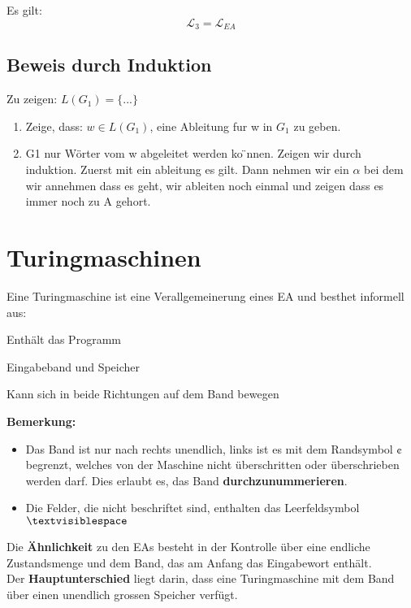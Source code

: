 \documentclass[11pt]{article}
\begin{document}
Es gilt:
\begin{equation*}
	\mathcal{L}_3 = \mathcal{L}_{EA}
\end{equation*}

\subsection{Beweis durch Induktion}

Zu zeigen: $L(G_1) = \{...\}$
\begin{enumerate}
	\item Zeige, dass: $w \in L(G_1)$, eine Ableitung fur w in $G_1$ zu geben.
	\item G1 nur W{\"o}rter vom w abgeleitet werden ko ̈nnen. Zeigen wir durch induktion. Zuerst mit ein ableitung es gilt. Dann nehmen wir ein $\alpha$ bei dem wir annehmen dass es geht, wir ableiten noch einmal und zeigen dass es immer noch zu A gehort.
\end{enumerate}

\section{Turingmaschinen}

Eine Turingmaschine ist eine Verallgemeinerung eines EA und besthet informell aus:
\begin{description}[labelindent=16pt,style=multiline,leftmargin=4.5cm, noitemsep]
	\item[Kontrolle:] Enth{\"a}lt das Programm
	\item[Unendliches Band:] Eingabeband und Speicher
	\item[Lese-/Schreibkopf:] Kann sich in beide Richtungen auf dem Band bewegen
\end{description}

\textbf{Bemerkung:} \begin{itemize}
	\item Das Band ist nur nach rechts unendlich, links ist es mit dem Randsymbol $\cent$ begrenzt, welches von der Maschine nicht {\"u}berschritten oder {\"u}berschrieben werden darf. Dies erlaubt es, das Band \textbf{durchzunummerieren}.
	\item Die Felder, die nicht beschriftet sind, enthalten das Leerfeldsymbol $\textvisiblespace$
\end{itemize}

Die \textbf{{\"A}hnlichkeit} zu den EAs besteht in der Kontrolle {\"u}ber eine endliche Zustandsmenge und dem Band, das am Anfang das Eingabewort enth{\"a}lt. \\
Der \textbf{Hauptunterschied} liegt darin, dass eine Turingmaschine mit dem Band {\"u}ber einen unendlich grossen Speicher verf{\"u}gt. \\
\end{document}
